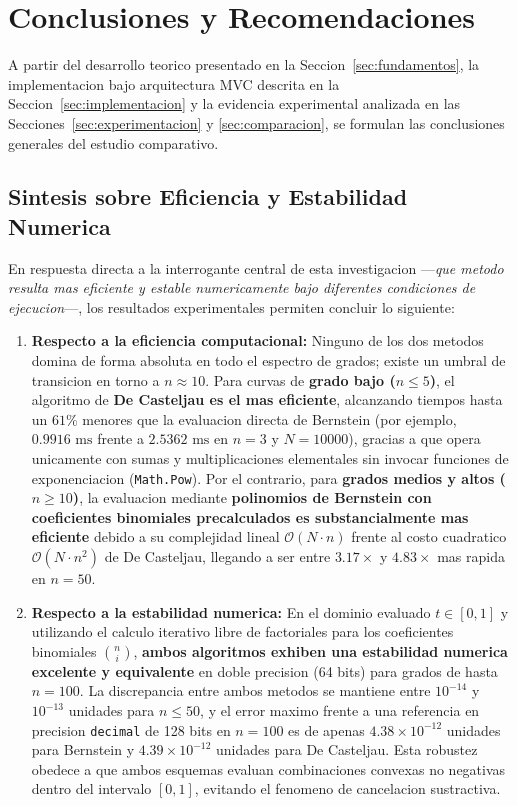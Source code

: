 \section{Conclusiones y Recomendaciones}
\label{sec:conclusiones}

A partir del desarrollo teorico presentado en la Seccion~\ref{sec:fundamentos}, la implementacion bajo arquitectura MVC descrita en la Seccion~\ref{sec:implementacion} y la evidencia experimental analizada en las Secciones~\ref{sec:experimentacion} y \ref{sec:comparacion}, se formulan las conclusiones generales del estudio comparativo.

\subsection{Sintesis sobre Eficiencia y Estabilidad Numerica}
\label{subsec:conc_respuesta}

En respuesta directa a la interrogante central de esta investigacion ---\textit{que metodo resulta mas eficiente y estable numericamente bajo diferentes condiciones de ejecucion}---, los resultados experimentales permiten concluir lo siguiente:

\begin{enumerate}
    \item \textbf{Respecto a la eficiencia computacional:} Ninguno de los dos metodos domina de forma absoluta en todo el espectro de grados; existe un umbral de transicion en torno a $n \approx 10$. Para curvas de \textbf{grado bajo ($n \le 5$)}, el algoritmo de \textbf{De Casteljau es el mas eficiente}, alcanzando tiempos hasta un $61\%$ menores que la evaluacion directa de Bernstein (por ejemplo, $0.9916\text{ ms}$ frente a $2.5362\text{ ms}$ en $n = 3$ y $N = 10000$), gracias a que opera unicamente con sumas y multiplicaciones elementales sin invocar funciones de exponenciacion (\texttt{Math.Pow}). Por el contrario, para \textbf{grados medios y altos ($n \ge 10$)}, la evaluacion mediante \textbf{polinomios de Bernstein con coeficientes binomiales precalculados es substancialmente mas eficiente} debido a su complejidad lineal $\mathcal{O}(N \cdot n)$ frente al costo cuadratico $\mathcal{O}(N \cdot n^2)$ de De Casteljau, llegando a ser entre $3.17\times$ y $4.83\times$ mas rapida en $n = 50$.
    \item \textbf{Respecto a la estabilidad numerica:} En el dominio evaluado $t \in [0, 1]$ y utilizando el calculo iterativo libre de factoriales para los coeficientes binomiales $\binom{n}{i}$, \textbf{ambos algoritmos exhiben una estabilidad numerica excelente y equivalente} en doble precision (64 bits) para grados de hasta $n = 100$. La discrepancia entre ambos metodos se mantiene entre $10^{-14}$ y $10^{-13}$ unidades para $n \le 50$, y el error maximo frente a una referencia en precision \texttt{decimal} de 128 bits en $n = 100$ es de apenas $4.38 \times 10^{-12}$ unidades para Bernstein y $4.39 \times 10^{-12}$ unidades para De Casteljau. Esta robustez obedece a que ambos esquemas evaluan combinaciones convexas no negativas dentro del intervalo $[0, 1]$, evitando el fenomeno de cancelacion sustractiva.
\end{enumerate}

